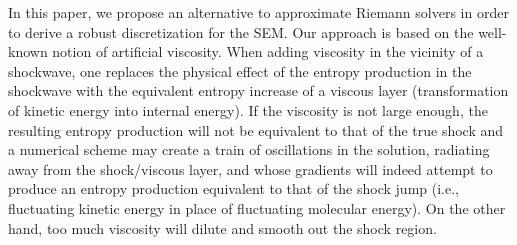 \documentclass[preprint,10pt]{elsarticle}
\begin{document}
In this paper, we propose an alternative to approximate Riemann solvers in order to derive a robust discretization for the SEM. Our approach is 
based on the well-known notion of artificial viscosity.  
When adding viscosity in the vicinity of a shockwave, one replaces the physical effect of the entropy production in the shockwave with the equivalent entropy increase of a viscous layer (transformation of kinetic energy into internal energy).  
If the viscosity is not large enough, the resulting entropy production will not be equivalent to that of the true shock and a numerical scheme 
may create a train of oscillations in the solution, radiating away from the shock/viscous layer, and whose gradients will indeed attempt to produce 
an entropy production equivalent to that of the shock jump (i.e., fluctuating kinetic energy in place of fluctuating molecular energy). 
On the other hand, too much viscosity will dilute and smooth out the shock region.  
%
%
\end{document}
